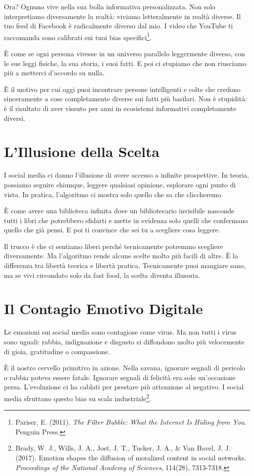 Ora? Ognuno vive nella sua bolla informativa personalizzata. Non solo interpretiamo diversamente la realtà: viviamo letteralmente in realtà diverse. Il tuo feed di Facebook è radicalmente diverso dal mio. I video che YouTube ti raccomanda sono calibrati sui tuoi bias specifici\footnote{Pariser, E. (2011). \textit{The Filter Bubble: What the Internet Is Hiding from You}. Penguin Press.}.

È come se ogni persona vivesse in un universo parallelo leggermente diverso, con le sue leggi fisiche, la sua storia, i suoi fatti. E poi ci stupiamo che non riusciamo più a metterci d'accordo su nulla.

È il motivo per cui oggi puoi incontrare persone intelligenti e colte che credono sinceramente a cose completamente diverse sui fatti più basilari. Non è stupidità: è il risultato di aver vissuto per anni in ecosistemi informativi completamente diversi.

\section{L'Illusione della Scelta}

I social media ci danno l'illusione di avere accesso a infinite prospettive. In teoria, possiamo seguire chiunque, leggere qualsiasi opinione, esplorare ogni punto di vista. In pratica, l'algoritmo ci mostra solo quello che sa che cliccheremo.

È come avere una biblioteca infinita dove un bibliotecario invisibile nasconde tutti i libri che potrebbero sfidarti e mette in evidenza solo quelli che confermano quello che già pensi. E poi ti convince che sei tu a scegliere cosa leggere.

Il trucco è che ci sentiamo liberi perché tecnicamente potremmo scegliere diversamente. Ma l'algoritmo rende alcune scelte molto più facili di altre. È la differenza tra libertà teorica e libertà pratica. Tecnicamente puoi mangiare sano, ma se vivi circondato solo da fast food, la scelta diventa illusoria.

\section{Il Contagio Emotivo Digitale}

Le emozioni sui social media sono contagiose come virus. Ma non tutti i virus sono uguali: rabbia, indignazione e disgusto si diffondono molto più velocemente di gioia, gratitudine o compassione.

È il nostro cervello primitivo in azione. Nella savana, ignorare segnali di pericolo o rabbia poteva essere fatale. Ignorare segnali di felicità era solo un'occasione persa. L'evoluzione ci ha cablati per prestare più attenzione al negativo. I social media sfruttano questo bias su scala industriale\footnote{Brady, W. J., Wills, J. A., Jost, J. T., Tucker, J. A., \& Van Bavel, J. J. (2017). Emotion shapes the diffusion of moralized content in social networks. \textit{Proceedings of the National Academy of Sciences}, 114(28), 7313-7318.}.

